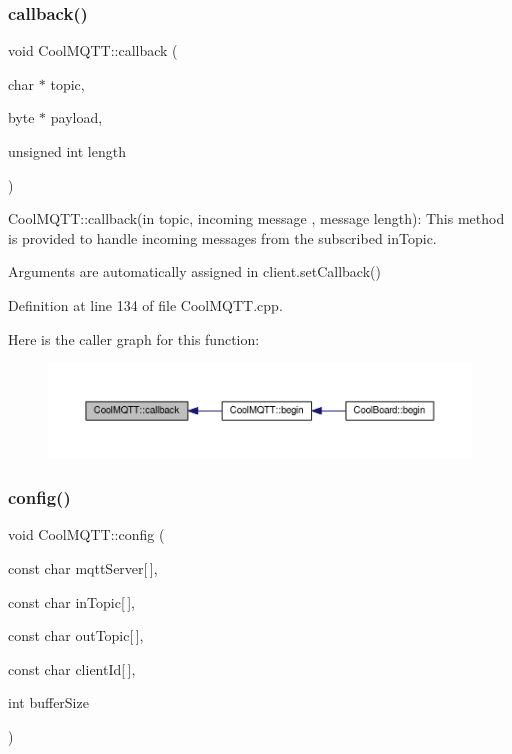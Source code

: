 \subsubsection{\texorpdfstring{callback()}{callback()}}
{\footnotesize\ttfamily void Cool\+M\+Q\+T\+T\+::callback (\begin{DoxyParamCaption}\item[{char $\ast$}]{topic,  }\item[{byte $\ast$}]{payload,  }\item[{unsigned int}]{length }\end{DoxyParamCaption})}

Cool\+M\+Q\+T\+T\+::callback(in topic, incoming message , message length)\+: This method is provided to handle incoming messages from the subscribed in\+Topic.

Arguments are automatically assigned in client.\+set\+Callback() 

Definition at line 134 of file Cool\+M\+Q\+T\+T.\+cpp.

Here is the caller graph for this function\+:\nopagebreak
\begin{figure}[H]
\begin{center}
\leavevmode
\includegraphics[width=350pt]{class_cool_m_q_t_t_a30d82ad665bfb603f46ecdbc290775df_icgraph}
\end{center}
\end{figure}
\mbox{\label{class_cool_m_q_t_t_a0158596b9a2297c8ba609b56ce6bace1}} 
\subsubsection{\texorpdfstring{config()}{config()}\hspace{0.1cm}{\footnotesize\ttfamily [1/2]}}
{\footnotesize\ttfamily void Cool\+M\+Q\+T\+T\+::config (\begin{DoxyParamCaption}\item[{const char}]{mqtt\+Server\mbox{[}$\,$\mbox{]},  }\item[{const char}]{in\+Topic\mbox{[}$\,$\mbox{]},  }\item[{const char}]{out\+Topic\mbox{[}$\,$\mbox{]},  }\item[{const char}]{client\+Id\mbox{[}$\,$\mbox{]},  }\item[{int}]{buffer\+Size }\end{DoxyParamCaption})}

